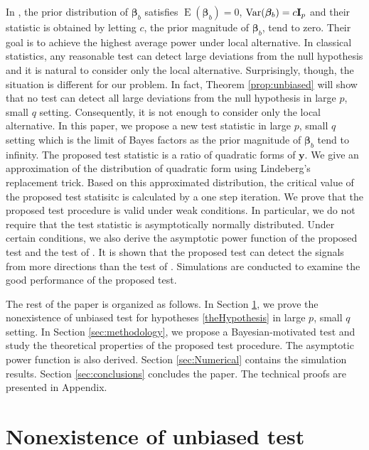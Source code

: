 \documentclass[smallextended]{svjour3}       %
\DeclareMathOperator{\myE}{E}
\DeclareMathOperator{\myVar}{Var}
\newcommand{\By}{\mathbf{y}}    \newcommand{\Bz}{\mathbf{z}}
\newcommand{\bfsym}[1]{\ensuremath{\boldsymbol{#1}}}
\def\bbeta{\bfsym \beta}
\begin{document}
In \cite{Goeman2006}, the prior distribution of $\bbeta_b$ satisfies $\myE (\bbeta_b)= 0$, $\myVar (\bbeta_b)=c \BI_p$ and their statistic is obtained by letting $c$, the prior magnitude of $\bbeta_b$, tend to zero.
Their goal is to achieve the highest average power under local alternative.
In classical statistics, any reasonable test can detect large deviations from the null hypothesis and it is natural to consider only the local alternative.
Surprisingly, though, the situation is different for our problem.
In fact, Theorem \ref{prop:unbiased} will show that no test can detect all large deviations from the null hypothesis in large $p$, small $q$ setting.
Consequently, it is not enough to consider only the local alternative.
In this paper, we propose a new test statistic in large $p$, small $q$ setting which is the limit of Bayes factors as the prior magnitude of $\bbeta_b$ tend to infinity.
The proposed test statistic is a ratio of quadratic forms of $\By$.
We give an approximation of the distribution of quadratic form using Lindeberg's replacement trick.
Based on this approximated distribution, the critical value of the proposed test statisitc is calculated by a one step iteration.
We prove that the proposed test procedure is valid under weak conditions.
In particular, we do not require that the test statistic is asymptotically normally distributed.
Under certain conditions, we also derive the asymptotic power function of the proposed test and the test of \cite{Goeman2006}.
It is shown that the proposed test can detect the signals from more directions than the test of \cite{Goeman2006}.
Simulations are conducted to examine the good performance of the proposed test.


The rest of the paper is organized as follows.
In Section \ref{sec:unbiased}, we prove the nonexistence of unbiased test for hypotheses \eqref{theHypothesis} in large $p$, small $q$ setting.
In Section \ref{sec:methodology}, we propose a Bayesian-motivated test and study the theoretical properties of the proposed test procedure.
The asymptotic power function is also derived.
Section \ref{sec:Numerical} contains the simulation results. 
Section \ref{sec:conclusions} concludes the paper.
The technical proofs are presented in Appendix.


\section{Nonexistence of unbiased test}\label{sec:unbiased}
\end{document}
